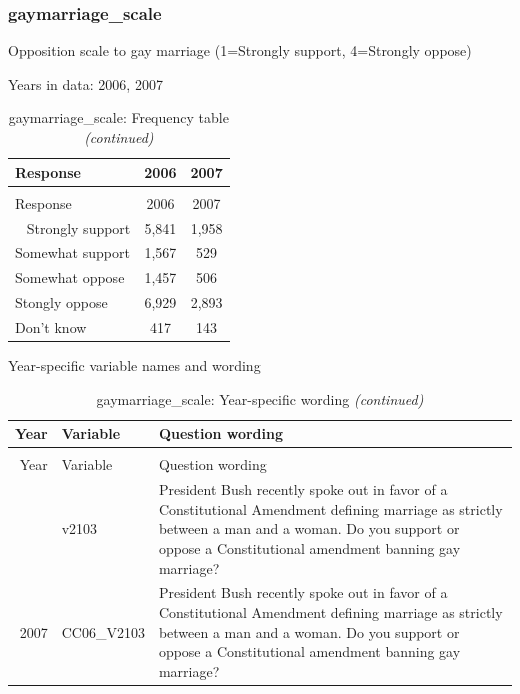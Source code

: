 \documentclass[12pt]{article}
\begin{document}
\subsubsection{gaymarriage\_scale}\label{gaymarriage_scale}

Opposition scale to gay marriage (1=Strongly support, 4=Strongly oppose)

Years in data: 2006, 2007\begingroup\fontsize{10}{12}\selectfont

\begin{longtable}[t]{lcc}
\caption{\label{tab:unnamed-chunk-4}gaymarriage\_scale: Frequency table}\\
\toprule
Response & 2006 & 2007\\
\midrule
\endfirsthead
\caption[]{gaymarriage\_scale: Frequency table \textit{(continued)}}\\
\toprule
Response & 2006 & 2007\\
\midrule
\endhead
\
\endfoot
\bottomrule
\endlastfoot
Strongly support & 5,841 & 1,958\\
Somewhat support & 1,567 & 529\\
Somewhat oppose & 1,457 & 506\\
Stongly oppose & 6,929 & 2,893\\
Don't know & 417 & 143\\*
\end{longtable}

\endgroup{}

Year-specific variable names and wording

\begin{longtable}[t]{rl>{\raggedright\arraybackslash}p{10cm}}
\caption{\label{tab:unnamed-chunk-4}gaymarriage\_scale: Year-specific wording}\\
\toprule
Year & Variable & Question wording\\
\midrule
\endfirsthead
\caption[]{gaymarriage\_scale: Year-specific wording \textit{(continued)}}\\
\toprule
Year & Variable & Question wording\\
\midrule
\endhead
\
\endfoot
\bottomrule
\endlastfoot
2006 & v2103 & President Bush recently spoke out in favor of a Constitutional Amendment defining marriage as strictly between a man and a woman. Do you support or oppose a Constitutional amendment banning gay marriage?\\
2007 & CC06\_V2103 & President Bush recently spoke out in favor of a Constitutional Amendment defining marriage as strictly between a man and a woman. Do you support or oppose a Constitutional amendment banning gay marriage?\\*
\end{longtable}
\end{document}
